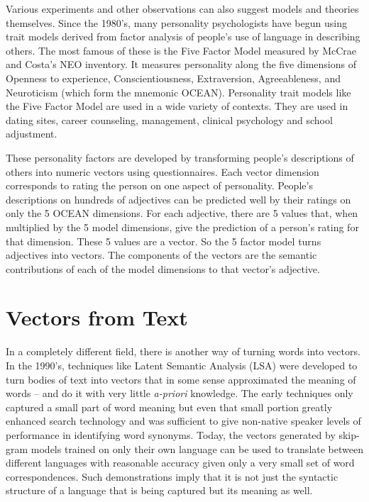 Various experiments and other observations can also suggest models and
theories themselves. Since the 1980's, many personality psychologists
have begun using trait models derived from factor analysis of people's
use of language in describing others. The most famous of these is
the Five Factor Model measured by McCrae and Costa's NEO inventory. It
measures personality along the five dimensions of Openness to
experience, Conscientiousness, Extraversion, Agreeableness, and
Neuroticism (which form the mnemonic OCEAN). Personality trait models
like the Five Factor Model are used in a wide variety of contexts.
They are used in dating sites, career counseling, management, clinical
psychology and school adjustment.

These personality factors are developed by transforming people's
descriptions of others into numeric vectors using questionnaires. Each
vector dimension corresponds to rating the person on one aspect of
personality. People's descriptions on hundreds of adjectives can be
predicted well by their ratings on only the 5 OCEAN dimensions. For
each adjective, there are 5 values that, when multiplied by the 5
model dimensions, give the prediction of a person's rating for that
dimension.  These 5 values are a vector. So the 5 factor model turns
adjectives into vectors. The components of the vectors are the
semantic contributions of each of the model dimensions to that
vector's adjective.

\section{Vectors from Text}

In a completely different field, there is another way of turning words into 
vectors. In the 1990's, techniques like Latent Semantic Analysis (LSA) were 
developed to turn bodies of text into vectors that in some sense approximated 
the meaning of words -- and do it with very little \textit{a-priori} knowledge. 
The early techniques only captured a small part of word meaning but even that
small portion greatly enhanced search technology and was sufficient to give
non-native speaker levels of performance in identifying word synonyms. Today, 
the vectors generated by skip-gram models trained on only their own language 
can be used to translate between different languages with reasonable accuracy 
given only a very small set of word correspondences. Such demonstrations imply 
that it is not just the syntactic structure of a language that is being 
captured but its meaning as well.

